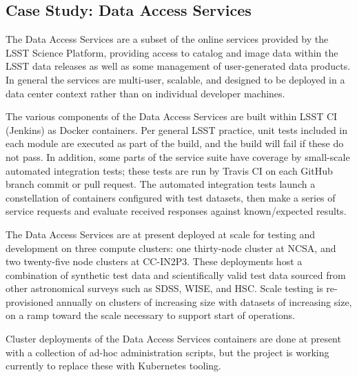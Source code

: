 \subsection{Case Study: Data Access Services}

The Data Access Services are a subset of the online services provided by the LSST Science Platform,\cite{LSE-319} providing
access to catalog and image data within the LSST data releases as well as some management of user-generated
data products.  In general the services are multi-user, scalable, and designed to be deployed in a data
center context rather than on individual developer machines.

The various components of the Data Access Services are built within LSST CI (Jenkins) as Docker containers.
Per general LSST practice, unit tests included in each module are executed as part of the build, and the build
will fail if these do not pass.  In addition, some parts of the service suite have coverage by small-scale automated integration tests; these tests are run by Travis CI on each GitHub branch commit or pull
request.  The automated integration tests launch a constellation of containers configured with test datasets,
then make a series of service requests and evaluate received responses against known/expected results.

The Data Access Services are at present deployed at scale for testing and development on three compute
clusters: one thirty-node cluster at NCSA, and two twenty-five node clusters at CC-IN2P3.  These deployments
host a combination of synthetic test data and scientifically valid test data sourced from other astronomical
surveys such as SDSS, WISE, and HSC.  Scale testing is re-provisioned annually on clusters of increasing size
with datasets of increasing size, on a ramp toward the scale necessary to support start of operations.

Cluster deployments of the Data Access Services containers are done at present with a collection of ad-hoc
administration scripts, but the project is working currently to replace these with Kubernetes tooling.
